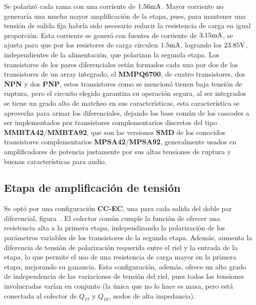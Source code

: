 Se polarizó cada rama con una corriente de $1.56 \si[per-mode=symbol]{\milli\ampere}$. Mayor corriente no generaría una mucho mayor amplificación de la etapa, pues, para mantener una tensión de salida fija habría sido necesario reducir la resistencia de carga en igual proporción. Esta corriente se generó con fuentes de corriente de $3.15 \si[per-mode=symbol]{\milli\ampere}$, se ajusta para que por los resistores de carga circulen $1.5 \si[per-mode=symbol]{\milli\ampere}$, logrando los $23.85 \si[per-mode=symbol]{\volt}$, independientes de la alimentación, que polarizan la segunda etapa. Los transistores de los pares diferenciales están formados cada uno por dos de los transistores de un array integrado, el \textbf{MMPQ6700}, de cuatro transistores, dos \textbf{NPN} y dos \textbf{PNP}, estos transistores como se mencionó tienen baja tensión de ruptura, pero el circuito elegido garantiza su operación segura, al ser integrados se tiene un grado alto de matcheo en sus características, esta característica se aprovecha para armar los diferenciales, dejando los base común de los cascodes a ser implementados por transistores complementarios discretos del tipo \textbf{MMBTA42}/\textbf{MMBTA92}, que son las versiones \textbf{SMD} de los conocidos transistores complementarios \textbf{MPSA42}/\textbf{MPSA92}, generalmente usados en amplificadores de potencia justamente por sus altas tensiones de ruptura y buenas características para audio.





\clearpage


\subsection{Etapa de amplificación de tensión}

Se optó por una configuración \textbf{CC-EC}, una para cada salida del doble par diferencial, figura~. El colector común cumple la función de ofrecer una resistencia alta a la primera etapa, independizando la polarización de los parámetros variables de los transistores de la segunda etapa. Además, aumenta la diferencia de tensión de polarización requerida entre el riel y la entrada de la etapa, lo que permite el uso de una resistencia de carga mayor en la primera etapa, mejorando su ganancia. Esta configuración, además, ofrece un alto grado de independencia de las variaciones de tensión del riel, pues todas las tensiones involucradas varían en conjunto (la única que no lo hace es masa, pero está conectada al colector de $Q_{17}$ y $Q_{18}$, nodos de alta impedancia). 



